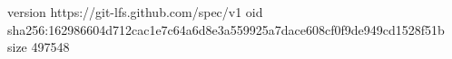 version https://git-lfs.github.com/spec/v1
oid sha256:162986604d712cac1e7c64a6d8e3a559925a7dace608cf0f9de949cd1528f51b
size 497548
